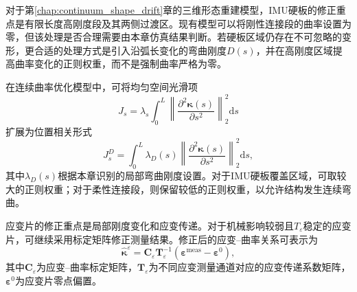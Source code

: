 \begin{table}[!htbp]
    \centering
    \caption{不同传感单元对连续体柔性段变形的影响}
    \label{tab:sensor_influence_comparison}
\end{table}

对于第\ref{chap:continuum_shape_drift}章的三维形态重建模型，IMU硬板的修正重点是有限长度高刚度段及其两侧过渡区。现有模型可以将刚性连接段的曲率设置为零，但该处理是否合理需要由本章仿真结果判断。若硬板区域仍存在不可忽略的变形，更合适的处理方式是引入沿弧长变化的弯曲刚度$D(s)$，并在高刚度区域提高曲率变化的正则权重，而不是强制曲率严格为零。

在连续曲率优化模型中，可将均匀空间光滑项
\begin{equation}
    J_s
    =
    \lambda_s
    \int_0^L
    \left\|
    \frac{\partial^2\bm\kappa(s)}
    {\partial s^2}
    \right\|_2^2
    \mathrm ds
    \label{eq:uniform_curvature_regularization}
\end{equation}
扩展为位置相关形式
\begin{equation}
    J_s^{D}
    =
    \int_0^L
    \lambda_D(s)
    \left\|
    \frac{\partial^2\bm\kappa(s)}
    {\partial s^2}
    \right\|_2^2
    \mathrm ds,
    \label{eq:rigidity_weighted_regularization}
\end{equation}
其中$\lambda_D(s)$根据本章识别的局部弯曲刚度设置。对于IMU硬板覆盖区域，可取较大的正则权重；对于柔性连接段，则保留较低的正则权重，以允许结构发生连续弯曲。

应变片的修正重点是局部刚度变化和应变传递。对于机械影响较弱且$T_{\varepsilon}$稳定的应变片，可继续采用标定矩阵修正测量结果。修正后的应变--曲率关系可表示为
\begin{equation}
    \hat{\bm\kappa}^{\varepsilon}
    =
    \bm C_{\varepsilon}
    \bm T_{\varepsilon}^{-1}
    \left(
    \bm\varepsilon^{\mathrm{meas}}
    -
    \bm\varepsilon^{0}
    \right),
    \label{eq:strain_transfer_corrected_curvature}
\end{equation}
其中$\bm C_{\varepsilon}$为应变--曲率标定矩阵，$\bm T_{\varepsilon}$为不同应变测量通道对应的应变传递系数矩阵，$\bm\varepsilon^{0}$为应变片零点偏置。

